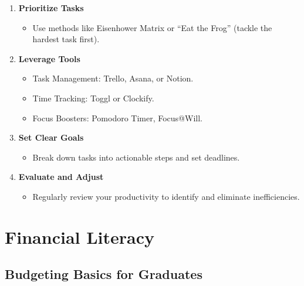 \documentclass[
  letterpaper,
  DIV=11,
  numbers=noendperiod]{scrreprt}
\providecommand{\tightlist}{%
  \setlength{\itemsep}{0pt}\setlength{\parskip}{0pt}}\usepackage{longtable,booktabs,array}
\begin{document}
\begin{enumerate}
\def\labelenumi{\arabic{enumi}.}
\item
  \textbf{Prioritize Tasks}

  \begin{itemize}
  \tightlist
  \item
    Use methods like Eisenhower Matrix or ``Eat the Frog'' (tackle the
    hardest task first).
  \end{itemize}
\item
  \textbf{Leverage Tools}

  \begin{itemize}
  \tightlist
  \item
    Task Management: Trello, Asana, or Notion.
  \item
    Time Tracking: Toggl or Clockify.
  \item
    Focus Boosters: Pomodoro Timer, Focus@Will.
  \end{itemize}
\item
  \textbf{Set Clear Goals}

  \begin{itemize}
  \tightlist
  \item
    Break down tasks into actionable steps and set deadlines.
  \end{itemize}
\item
  \textbf{Evaluate and Adjust}

  \begin{itemize}
  \tightlist
  \item
    Regularly review your productivity to identify and eliminate
    inefficiencies.
  \end{itemize}
\end{enumerate}


\chapter{Financial Literacy}\label{financial-literacy}

\section{Budgeting Basics for
Graduates}\label{budgeting-basics-for-graduates}
\end{document}
